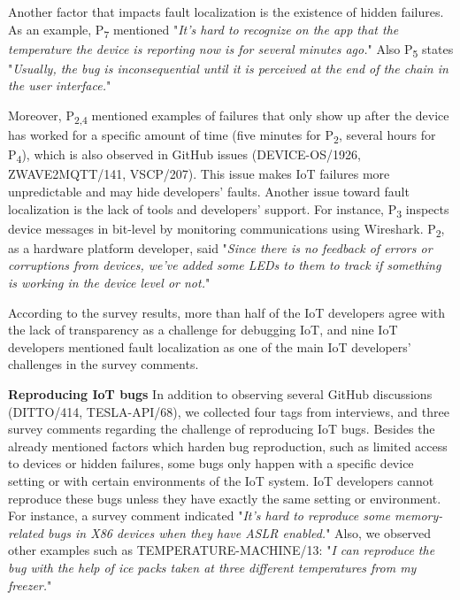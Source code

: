 {Another factor that impacts fault localization is the existence of hidden failures. As an example, P\textsubscript{7} mentioned "\emph{It's hard to recognize on the app that the temperature the device is reporting now is for several minutes ago.}" Also P\textsubscript{5} states "\emph{Usually, the bug is inconsequential until it is perceived at the end of the chain in the user interface.}"

Moreover, P\textsubscript{2,4} mentioned examples of failures that only show up after the device has worked for a specific amount of time (five minutes for P\textsubscript{2}, several hours for P\textsubscript{4}), which is also observed in GitHub issues (DEVICE-OS/1926, ZWAVE2MQTT/141, VSCP/207). This issue makes IoT failures more unpredictable and may hide developers' faults. Another issue toward fault localization is the lack of tools and developers' support. For instance, P\textsubscript{3} inspects device messages in bit-level by monitoring communications using Wireshark. P\textsubscript{2}, as a hardware platform developer, said "\emph{Since there is no feedback of errors or corruptions from devices, we've added some LEDs to them to track if something is working in the device level or not.}"  

According to the survey results, more than half of the IoT developers agree with the lack of transparency as a challenge for debugging IoT, and nine IoT developers mentioned fault localization as one of the main IoT developers' challenges in the survey comments.


\textbf{Reproducing IoT bugs}
In addition to observing several GitHub discussions (DITTO/414, TESLA-API/68), we collected four tags from interviews, and three survey comments regarding the challenge of reproducing IoT bugs. Besides the already mentioned factors which harden bug reproduction, such as limited access to devices or hidden failures, some bugs only happen with a specific device setting or with certain environments of the IoT system. IoT developers cannot reproduce these bugs unless they have exactly the same setting or environment. For instance, a survey comment indicated "\emph{It's hard to reproduce some memory-related bugs in X86 devices when they have ASLR enabled.}"
Also, we observed other examples such as TEMPERATURE-MACHINE/13: "\emph{I can reproduce the bug with the help of ice packs taken at three different temperatures from my freezer.}"

}
